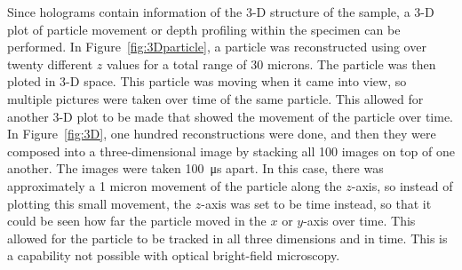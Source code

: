 Since holograms contain information of the 3-D structure of the sample, a 3-D
plot of particle movement or depth profiling within the specimen can be
performed. In Figure~\ref{fig:3Dparticle}, a particle was reconstructed using over
twenty different $z$ values for a total range of 30 microns. The particle was then ploted in 3-D
space. This particle was moving when it came into view, so multiple pictures
were taken over time of the same particle. This allowed for another 3-D plot to
be made that showed the movement of the particle over time.
In Figure~\ref{fig:3D}, one hundred reconstructions were done, and then they
were composed into a three-dimensional image by stacking all 100 images on top
of one another. The images were taken \SI{100}{\micro\second} apart. 
In this case, there was approximately a 1 micron movement 
of the particle along the $z$-axis, so instead of plotting this small movement,
the $z$-axis was set to be time instead, so that it could be seen how far the
particle moved in the $x$ or $y$-axis over time.
This allowed for the
particle to be tracked in all three dimensions and in time. This is a
capability not possible with optical bright-field microscopy.




%
%
%
